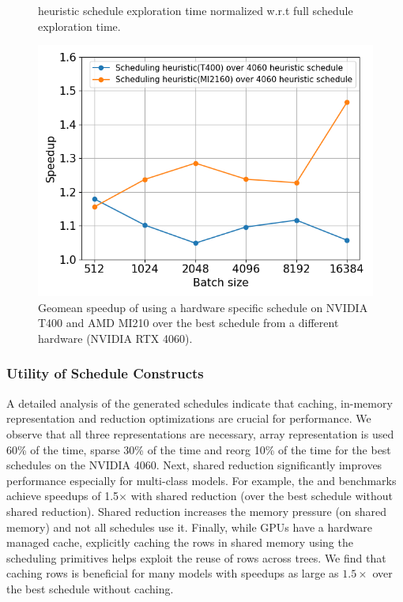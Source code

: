 \begin{figure}[h]
\begin{minipage}[t]{.3\linewidth}
{    heuristic schedule exploration time normalized w.r.t full schedule exploration time.}
    \label{Fig:HeuristicVsFullExplore_Speedup}
  \end{minipage}
  \hspace{0.5cm}
  \begin{minipage}[t]{.3\linewidth}
    \centering
    \includegraphics[width=\linewidth]{figures/geomean_speedup_T400_4060_vs_T400_vs_MI2160.png}
    \caption{Geomean speedup of using a hardware specific schedule on NVIDIA T400 and AMD MI210 over the best schedule from a different hardware (NVIDIA RTX 4060).}
    \label{Fig:AutotuningSpeedupvs4060Sched}
  \end{minipage}
  \end{figure}
  
\subsubsection*{Utility of Schedule Constructs}
A detailed analysis of the generated schedules indicate that caching, in-memory representation 
and reduction optimizations are crucial for performance. We observe that all three representations 
are necessary, array representation is used 60\% of the time, sparse 30\% of the time and reorg 
10\% of the time for the best schedules on the NVIDIA 4060.  
Next, shared reduction significantly improves performance especially for multi-class models. For example, 
the  and  benchmarks achieve speedups of 1.5$\times$ with shared reduction (over the best schedule without shared reduction). 
Shared reduction increases the memory pressure (on shared memory) and not all schedules use it.
Finally, while GPUs have a hardware managed cache, explicitly caching the rows in shared memory using the scheduling primitives 
helps exploit the reuse of rows across trees. We find that caching rows is beneficial for many models
with speedups as large as $1.5\times$ over the best schedule without caching.

